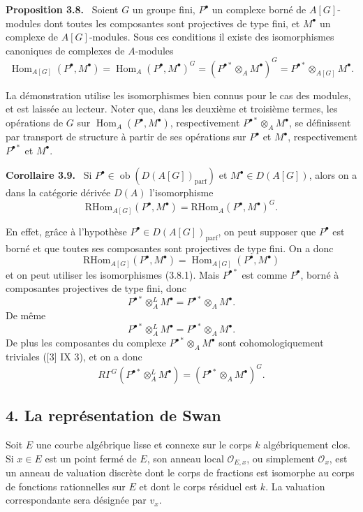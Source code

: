 \documentclass[11pt]{article}
\newenvironment{statement}[1]{\par\medskip\noindent\textbf{#1.}\ }{\par\medskip}
\DeclareMathOperator{\Hom}{Hom}
\providecommand{\RHom}{\mathrm{RHom}}
\providecommand{\parf}{\mathrm{parf}}
\providecommand{\Ob}{\operatorname{ob}}
\providecommand{\RHom}{\mathrm{RHom}}
\providecommand{\Hom}{\operatorname{Hom}}
\providecommand{\RHom}{\mathrm R\mathcal{H}om}
\providecommand{\Ob}{\operatorname{ob}}
\providecommand{\Ob}{\operatorname{Ob}}
\providecommand{\parf}{\mathrm{parf}}
\providecommand{\RHom}{\mathrm{RHom}}
\providecommand{\Hom}{\operatorname{Hom}}
\providecommand{\Ob}{\operatorname{ob}}
\begin{document}
\begin{statement}{Proposition 3.8}
Soient $G$ un groupe fini, $P^\bullet$ un complexe borné de $A[G]$-modules dont toutes les composantes sont projectives de type fini, et $M^\bullet$ un complexe de $A[G]$-modules. Sous ces conditions il existe des isomorphismes canoniques de complexes de $A$-modules
\[
\Hom_{A[G]}(P^\bullet,M^\bullet)=\Hom_A(P^\bullet,M^\bullet)^G=(P^{\bullet *}\otimes_A M^\bullet)^G=P^{\bullet *}\otimes_{A[G]}M^\bullet.
\tag{3.8.1}
\]
\end{statement}

La démonstration utilise les isomorphismes bien connus pour le cas des modules, et est laissée au lecteur. Noter que, dans les deuxième et troisième termes, les opérations de $G$ sur $\Hom_A(P^\bullet,M^\bullet)$, respectivement $P^{\bullet *}\otimes_A M^\bullet$, se définissent par transport de structure à partir de ses opérations sur $P^\bullet$ et $M^\bullet$, respectivement $P^{\bullet *}$ et $M^\bullet$.

\begin{statement}{Corollaire 3.9}
Si $P^\bullet\in\Ob(D(A[G])_{\parf})$ et $M^\bullet\in D(A[G])$, alors on a dans la catégorie dérivée $D(A)$ l'isomorphisme
\[
\RHom_{A[G]}(P^\bullet,M^\bullet)=\RHom_A(P^\bullet,M^\bullet)^G.
\tag{3.9.1}
\]
\end{statement}

En effet, grâce à l'hypothèse $P^\bullet\in D(A[G])_{\parf}$, on peut supposer que $P^\bullet$ est borné et que toutes ses composantes sont projectives de type fini. On a donc
\[
\RHom_{A[G]}(P^\bullet,M^\bullet)=\Hom_{A[G]}(P^\bullet,M^\bullet)
\]
et on peut utiliser les isomorphismes (3.8.1). Mais $P^{\bullet *}$ est comme $P^\bullet$, borné à composantes projectives de type fini, donc
\[
P^{\bullet *}\otimes_A^L M^\bullet=P^{\bullet *}\otimes_A M^\bullet.
\]
De même
\[
P^{\bullet *}\otimes_A^L M^\bullet=P^{\bullet *}\otimes_A M^\bullet.
\]
De plus les composantes du complexe $P^{\bullet *}\otimes_A M^\bullet$ sont cohomologiquement triviales ([3] IX 3), et on a donc
\[
R\Gamma^G(P^{\bullet *}\otimes_A^L M^\bullet)=(P^{\bullet *}\otimes_A M^\bullet)^G.
\]

\subsection*{4. La représentation de Swan}

Soit $E$ une courbe algébrique lisse et connexe sur le corps $k$ algébriquement clos. Si $x\in E$ est un point fermé de $E$, son anneau local $\mathcal O_{E,x}$, ou simplement $\mathcal O_x$, est un anneau de valuation discrète dont le corps de fractions est isomorphe au corps de fonctions rationnelles sur $E$ et dont le corps résiduel est $k$. La valuation correspondante sera désignée par $v_x$.
\end{document}

